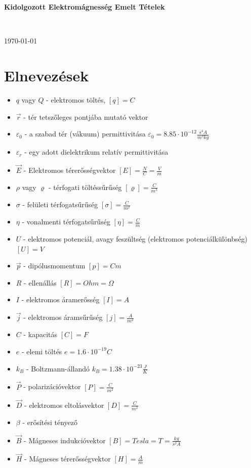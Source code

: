 \documentclass{article}
\begin{document}
\setcounter{tocdepth}{2} 
\begin{titlepage}
\begin{center}
        \vspace*{1cm}
            
        \Large
        \textbf{Kidolgozott Elektromágnesség Emelt Tételek}

            
        \vspace{1.5cm} \\
            
        \vfill
            
        
        \today
            
    \end{center}

\end{titlepage}
\tableofcontents
\newpage
\section*{Elnevezések}
\begin{itemize}
\item $q$ vagy $Q$ - elektromos töltés, $[q]=C$
\item $\vec{r}$ - tér tetszőleges pontjába mutató vektor
\item $\varepsilon_0$ - a szabad tér (vákuum) permittivitása $\varepsilon_0 = 8.85 \cdot 10^{-12}\frac{s^4 A}{m^3 kg}$
\item $\varepsilon_r$ - egy adott dielektrikum relatív permittivitása
\item $\vec{E}$ - Elektromos térerősségvektor $[E] = \frac{N}{C} = \frac{V}{m}$
\item $\rho$ vagy $\varrho$ - térfogati töltéssűrűség $[\varrho] = \frac{C}{m^3}$
\item $\sigma$ - felületi térfogatsűrűség $[\sigma] = \frac{C}{m^2}$
\item $\eta$ - vonalmenti térfogatsűrűség $[\eta] = \frac{C}{m}$
\item $U$ - elektromos potenciál, avagy feszültség (elektromos potenciálkülönbség) $[U] = V$
\item $\vec{p}$ - dipólusmomentum $[p] = Cm$
\item $R$ - ellenállás $[R]=Ohm=\Omega$
\item $I$ - elektromos áramerősség $[I] = A$
\item $\vec{j}$ - elektromos áramsűrűség $[j] = \frac{A}{m^2}$
\item $C$ - kapacitás $[C] = F$
\item $e$ - elemi töltés $e=1.6\cdot 10^{-19} C$
\item $k_{B}$ - Boltzmann-állandó $k_{B} = 1.38 \cdot 10^{-23} \frac{J}{K}$
\item $\vec{P}$ - polarizációvektor $[P] = \frac{C}{m^2}$
\item $\vec{D}$ - elektromos eltolásvektor $[D] = \frac{C}{m^2}$
\item $\beta$ - erősítési tényező
\item $\vec{B}$ - Mágneses indukcióvektor $[B] = Tesla = T = \frac{kg}{s^2 A}$
\item $\vec{H}$ - Mágneses térerősségvektor $[H]=\frac{A}{m}$
\end{itemize}
\newpage
\end{document}
